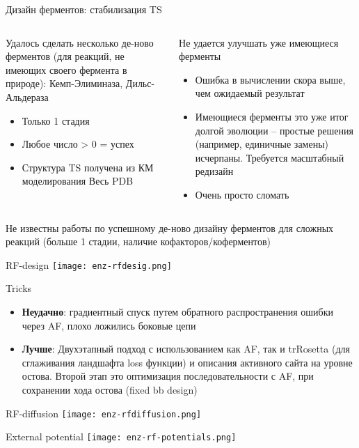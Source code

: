 \begin{frame}{Дизайн ферментов: стабилизация TS}
    \footnotesize
\begin{columns}
\begin{column}{0.5\textwidth}
    Удалось сделать несколько де-ново ферментов (для реакций, не имеющих своего фермента в природе): Кемп-Элиминаза, Дильс-Альдераза
    \begin{itemize}
        \item Только 1 стадия
        \item Любое число > 0 = успех
        \item Структура TS получена из КМ моделирования Весь PDB
    \end{itemize}
\end{column}
\begin{column}{0.3\textwidth}
    Не удается улучшать уже имеющиеся ферменты
    \begin{itemize}
        \item Ошибка в вычислении скора выше, чем ожидаемый результат
        \item Имеющиеся ферменты это уже итог долгой эволюции – простые решения (например, единичные замены) исчерпаны. Требуется масштабный редизайн
        \item Очень просто сломать
    \end{itemize}
\end{column}
\end{columns}
Не известны работы по успешному де-ново дизайну ферментов для сложных реакций (больше 1 стадии, наличие кофакторов/коферментов)
\end{frame}


\begin{frame}{RF-design}
    \centering
    \texttt{[image: enz-rfdesig.png]}\\
\end{frame}

\begin{frame}{Tricks}
    \begin{itemize}
        \item \textbf{Неудачно}: градиентный спуск путем обратного распространения ошибки через AF, плохо ложились боковые цепи
        \item \textbf{Лучше}: Двухэтапный подход с использованием как AF, так и trRosetta (для сглаживания ландшафта loss функции) и описания активного сайта
            на уровне остова. Второй этап это оптимизация последовательности с AF, при сохранении хода остова (fixed bb design)
        \end{itemize}
\end{frame}

\begin{frame}{RF-diffusion}
    \centering
    \texttt{[image: enz-rfdiffusion.png]}\\
\end{frame}

\begin{frame}{External potential}
    \centering
    \texttt{[image: enz-rf-potentials.png]}\\
\end{frame}

